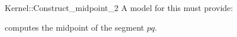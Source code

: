 \begin{ccRefFunctionObjectConcept}{Kernel::Construct_midpoint_2}
A model for this must provide:


 {computes the midpoint of the segment $pq$.}

\end{ccRefFunctionObjectConcept}

